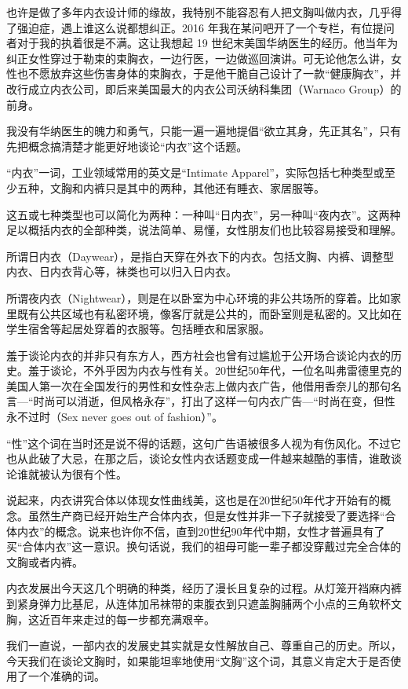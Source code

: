 \documentclass[12pt,UTF8]{ctexbook}
\begin{document}
也许是做了多年内衣设计师的缘故，我特别不能容忍有人把文胸叫做内衣，几乎得了强迫症，遇上谁这么说都想纠正。2016 年我在某问吧开了一个专栏，有位提问者对于我的执着很是不满。这让我想起 19 世纪末美国华纳医生的经历。他当年为纠正女性穿过于勒束的束胸衣，一边行医，一边做巡回演讲。可无论他怎么讲，女性也不愿放弃这些伤害身体的束胸衣，于是他干脆自己设计了一款“健康胸衣”，并改行成立内衣公司，即后来美国最大的内衣公司沃纳科集团（Warnaco Group）的前身。

我没有华纳医生的魄力和勇气，只能一遍一遍地提倡“欲立其身，先正其名”，只有先把概念搞清楚才能更好地谈论“内衣”这个话题。


“内衣”一词，工业领域常用的英文是“Intimate Apparel”，实际包括七种类型或至少五种，文胸和内裤只是其中的两种，其他还有睡衣、家居服等。

这五或七种类型也可以简化为两种：一种叫“日内衣”，另一种叫“夜内衣”。这两种足以概括内衣的全部种类，说法简单、易懂，女性朋友们也比较容易接受和理解。

所谓日内衣（Daywear），是指白天穿在外衣下的内衣。包括文胸、内裤、调整型内衣、日内衣背心等，袜类也可以归入日内衣。

所谓夜内衣（Nightwear），则是在以卧室为中心环境的非公共场所的穿着。比如家里既有公共区域也有私密环境，像客厅就是公共的，而卧室则是私密的。又比如在学生宿舍等起居处穿着的衣服等。包括睡衣和居家服。


羞于谈论内衣的并非只有东方人，西方社会也曾有过尴尬于公开场合谈论内衣的历史。羞于谈论，不外乎因为内衣与性有关。20世纪50年代，一位名叫弗雷德里克的美国人第一次在全国发行的男性和女性杂志上做内衣广告，他借用香奈儿的那句名言—“时尚可以消逝，但风格永存”，打出了这样一句内衣广告—“时尚在变，但性永不过时（Sex never goes out of fashion）”。

“性”这个词在当时还是说不得的话题，这句广告语被很多人视为有伤风化。不过它也从此破了大忌，在那之后，谈论女性内衣话题变成一件越来越酷的事情，谁敢谈论谁就被认为很有个性。

说起来，内衣讲究合体以体现女性曲线美，这也是在20世纪50年代才开始有的概念。虽然生产商已经开始生产合体内衣，但是女性并非一下子就接受了要选择“合体内衣”的概念。说来也许你不信，直到20世纪90年代中期，女性才普遍具有了买“合体内衣”这一意识。换句话说，我们的祖母可能一辈子都没穿戴过完全合体的文胸或者内裤。

内衣发展出今天这几个明确的种类，经历了漫长且复杂的过程。从灯笼开裆麻内裤到紧身弹力比基尼，从连体加吊袜带的束腹衣到只遮盖胸脯两个小点的三角软杯文胸，这近百年来走过的每一步都充满艰辛。

我们一直说，一部内衣的发展史其实就是女性解放自己、尊重自己的历史。所以，今天我们在谈论文胸时，如果能坦率地使用“文胸”这个词，其意义肯定大于是否使用了一个准确的词。
\end{document}
